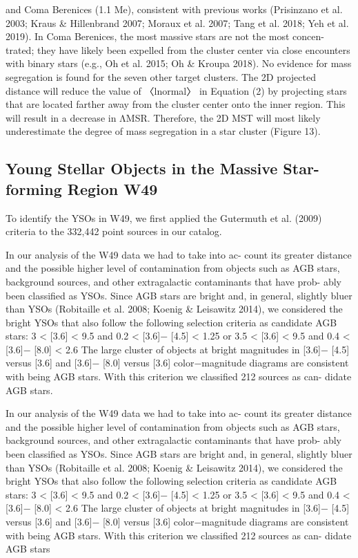 \documentclass[../Main.tex]{subfiles}
\begin{document}
{and Coma Berenices (1.1 Me), consistent with previous works
(Prisinzano et al. 2003; Kraus & Hillenbrand 2007; Moraux
et al. 2007; Tang et al. 2018; Yeh et al. 2019). In Coma
Berenices, the most massive stars are not the most concen-
trated; they have likely been expelled from the cluster center
via close encounters with binary stars (e.g., Oh et al. 2015; Oh
& Kroupa 2018). No evidence for mass segregation is found
for the seven other target clusters.
The 2D projected distance will reduce the value of 〈lnormal〉
in Equation (2) by projecting stars that are located farther away
from the cluster center onto the inner region. This will result in
a decrease in ΛMSR. Therefore, the 2D MST will most likely
underestimate the degree of mass segregation in a star cluster
(Figure 13).

\subsection{Young Stellar Objects in the Massive Star-forming Region W49}


To identify the YSOs in W49, we first applied the
Gutermuth et al. (2009) criteria to the 332,442 point sources
in our catalog.

In our analysis of the W49 data we had to take into ac-
count its greater distance and the possible higher level of
contamination from objects such as AGB stars, background
sources, and other extragalactic contaminants that have prob-
ably been classified as YSOs. Since AGB stars are bright and,
in general, slightly bluer than YSOs (Robitaille et al. 2008;
Koenig & Leisawitz 2014), we considered the bright YSOs
that also follow the following selection criteria as candidate
AGB stars:
3 < [3.6] < 9.5 and 0.2 < [3.6]− [4.5] < 1.25
or
3.5 < [3.6] < 9.5 and 0.4 < [3.6]− [8.0] < 2.6
The large cluster of objects at bright magnitudes in
[3.6]− [4.5] versus [3.6] and [3.6]− [8.0] versus [3.6]
color−magnitude diagrams are consistent with being AGB
stars. With this criterion we classified 212 sources as can-
didate AGB stars.


In our analysis of the W49 data we had to take into ac-
count its greater distance and the possible higher level of
contamination from objects such as AGB stars, background
sources, and other extragalactic contaminants that have prob-
ably been classified as YSOs. Since AGB stars are bright and,
in general, slightly bluer than YSOs (Robitaille et al. 2008;
Koenig & Leisawitz 2014), we considered the bright YSOs
that also follow the following selection criteria as candidate
AGB stars:
3 < [3.6] < 9.5 and 0.2 < [3.6]− [4.5] < 1.25
or
3.5 < [3.6] < 9.5 and 0.4 < [3.6]− [8.0] < 2.6
The large cluster of objects at bright magnitudes in
[3.6]− [4.5] versus [3.6] and [3.6]− [8.0] versus [3.6]
color−magnitude diagrams are consistent with being AGB
stars. With this criterion we classified 212 sources as can-
didate AGB stars

}
\end{document}
